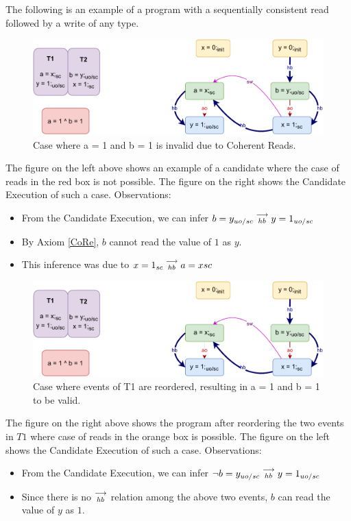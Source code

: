         The following is an example of a program with a sequentially consistent read followed by a write of any type. 
        \begin{figure}[H]
            \centering
            \includegraphics[scale=0.7]{5.InstructionReordering/4.ValidReorderingCandidate/Example3(Rsc-Wuo,sc).pdf}
            \caption{Case where a = 1 and b = 1 is invalid due to Coherent Reads.}
        \end{figure}
        The figure on the left above shows an example of a candidate where the case of reads in the red box is not possible. 
        The figure on the right shows the Candidate Execution of such a case. 
        Observations:
        \begin{itemize}
            \item From the Candidate Execution, we can infer $b=y_{uo/sc}\stackrel{\longrightarrow}{_{hb}}y=1_{uo/sc}$
            \item By Axiom \ref{CoRe}, $b$ cannot read the value of $1$ as $y$. 
            \item This inference was due to $x=1_{sc}\stackrel{\longrightarrow}{_{hb}}a=x{sc}$
        \end{itemize}

        \begin{figure}[H]
            \centering
            \includegraphics[scale=0.7]{5.InstructionReordering/4.ValidReorderingCandidate/Example3(Rsc-Wuo,sc).pdf}
            \caption{Case where events of T1 are reordered, resulting in  a = 1 and b = 1 to be valid.}
        \end{figure}
        The figure on the right above shows the program after reordering the two events in $T1$ where case of reads in the orange box is possible. 
        The figure on the left shows the Candidate Execution of such a case. 
        Observations:
        \begin{itemize}
            \item From the Candidate Execution, we can infer $\neg b=y_{uo/sc}\stackrel{\longrightarrow}{_{hb}}y=1_{uo/sc}$
            \item Since there is no $\stackrel{\longrightarrow}{_{hb}}$ relation among the above two events, $b$ can read the value of $y$ as $1$.
        \end{itemize}

